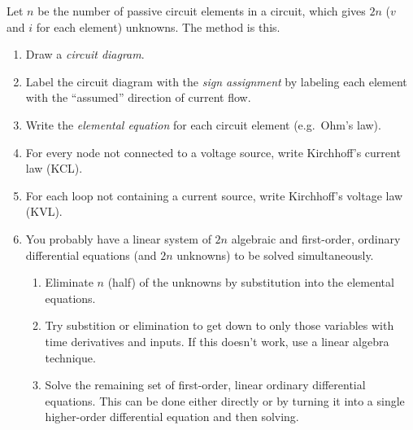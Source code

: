 \documentclass[electronics.tex]{subfiles}
\begin{document}
Let $n$ be the number of passive circuit elements in a circuit, which gives $2n$ ($v$ and $i$ for each element) unknowns. The method is this.
\begin{enumerate}
	\item Draw a \emph{circuit diagram}.
	\item Label the circuit diagram with the \emph{sign assignment} by labeling each element with the ``assumed'' direction of current flow.
	\item Write the \emph{elemental equation} for each circuit element (e.g.\ Ohm's law).
	\item For every node not connected to a voltage source, write Kirchhoff's current law (KCL).
	\item For each loop not containing a current source, write Kirchhoff's voltage law (KVL).
	\item You probably have a linear system of $2 n$ algebraic and first-order, ordinary differential equations (and $2 n$ unknowns) to be solved simultaneously. 
	\begin{enumerate}
		\item Eliminate $n$ (half) of the unknowns by substitution into the elemental equations.
		\item Try substition or elimination to get down to only those variables with time derivatives and inputs. If this doesn't work, use a linear algebra technique.
		\item Solve the remaining set of first-order, linear ordinary differential equations. This can be done either directly or by turning it into a single higher-order differential equation and then solving.
	\end{enumerate}
\end{enumerate}
\end{document}
